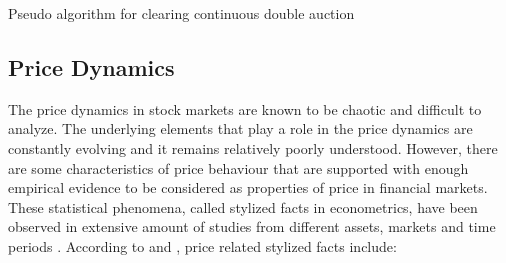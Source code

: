 \begin{algorithm}[H]
    \SetAlgoLined
    \DontPrintSemicolon

    \caption{Pseudo algorithm for clearing continuous double auction}
    \label{alg:lob_cont}
\end{algorithm}


\subsection{Price Dynamics}
The price dynamics in stock markets are known to be chaotic and difficult to 
analyze. The underlying elements that play a role in the price dynamics
are constantly evolving and it remains relatively poorly understood.
However, there are some characteristics of price behaviour that are supported
with enough empirical evidence to be considered as properties of price in
financial markets. These statistical phenomena, called stylized facts in
econometrics, have been observed in extensive amount of studies from 
different assets, markets and time periods \citep{Shakeel18}. 
According to \citet{StylizedFacts01} and \citet{lob13}, price related stylized
facts include:

